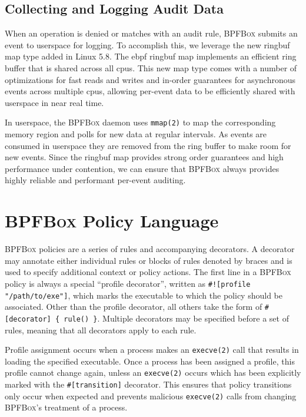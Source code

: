 \documentclass[
  fontsize=12pt,
  titlepage=firstiscover,
  paper=letter,
oneside,
  cleardoublepage=plain,
  parskip=half-,
  DIV=10,
  parindent,
  appendixprefix,
  chapterprefix,
  listof=totoc,
]{scrbook}
\newcommand{\bpfbox}{\textsc{BPFBox}}
\begin{document}
\subsection{Collecting and Logging Audit Data}\label{ss:bpfbox-audit}

When an operation is denied or matches with an audit rule, \bpfbox{} submits an event to
userspace for logging. To accomplish this, we leverage the new ringbuf map type added in
Linux 5.8. The \gls{ebpf} ringbuf map implements an efficient ring buffer that is shared
across all \glspl{cpu}. This new map type comes with a number of optimizations for fast
reads and writes and in-order guarantees for asynchronous events across multiple
\glspl{cpu}, allowing per-event data to be efficiently shared with userspace in near
real time.

In userspace, the \bpfbox{} daemon uses \texttt{mmap(2)} to map the corresponding memory
region and polls for new data at regular intervals. As events are consumed in userspace
they are removed from the ring buffer to make room for new events.  Since the ringbuf map
provides strong order guarantees and high performance under contention, we can ensure that
\bpfbox{} always provides highly reliable and performant per-event auditing.



\section{\bpfbox{} Policy Language}\label{s:bpfbox-policies}

\bpfbox{} policies are a series of rules and accompanying decorators. A decorator may
annotate either individual rules or blocks of rules denoted by braces and is used to
specify additional context or policy actions. The first line in a \bpfbox{} policy is
always a special \enquote{profile decorator}, written as
\lstinline[language=bpfbox]{#![profile "/path/to/exe"]}, which marks the executable to
which the policy should be associated.  Other than the profile decorator, all others take
the form of \lstinline[language=bpfbox]|#[decorator] { rule() }|. Multiple decorators may
be specified before a set of rules, meaning that all decorators apply to each rule.

Profile assignment occurs when a process makes an \texttt{execve(2)} call that results in
loading the specified executable.  Once a process has been assigned a profile, this
profile cannot change again, unless an \texttt{execve(2)} occurs which has been explicitly
marked with the \lstinline[language=bpfbox]{#[transition]} decorator. This ensures that
policy transitions only occur when expected and prevents malicious \texttt{execve(2)}
calls from changing \bpfbox{}'s treatment of a process.
\end{document}
